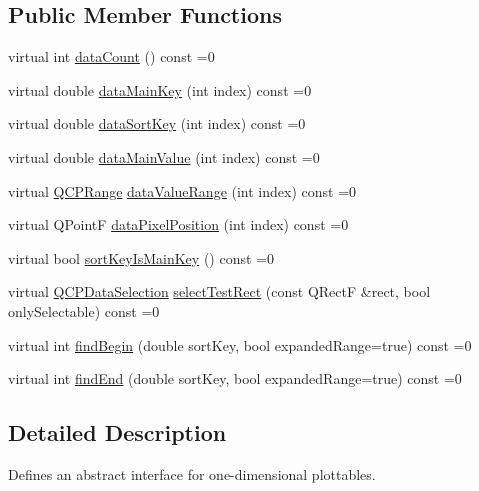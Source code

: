\subsection*{Public Member Functions}
\begin{DoxyCompactItemize}
\item 
virtual int \mbox{\hyperlink{class_q_c_p_plottable_interface1_d_a058a22c770ef4d5a0e878a7f02183da9}{data\+Count}} () const =0
\item 
virtual double \mbox{\hyperlink{class_q_c_p_plottable_interface1_d_a2bd60daaac046945fead558cbd83cf73}{data\+Main\+Key}} (int index) const =0
\item 
virtual double \mbox{\hyperlink{class_q_c_p_plottable_interface1_d_afdc92f9f01e7e35f2e96b2ea9dc14ae7}{data\+Sort\+Key}} (int index) const =0
\item 
virtual double \mbox{\hyperlink{class_q_c_p_plottable_interface1_d_af6330919e8023277d08c958a6074fc76}{data\+Main\+Value}} (int index) const =0
\item 
virtual \mbox{\hyperlink{class_q_c_p_range}{Q\+C\+P\+Range}} \mbox{\hyperlink{class_q_c_p_plottable_interface1_d_a9ca7fcf14d885a200879768679b19be9}{data\+Value\+Range}} (int index) const =0
\item 
virtual Q\+PointF \mbox{\hyperlink{class_q_c_p_plottable_interface1_d_a78911838cfbcfd2d8df9ad2fdbfb8e93}{data\+Pixel\+Position}} (int index) const =0
\item 
virtual bool \mbox{\hyperlink{class_q_c_p_plottable_interface1_d_a229e65e7ab968dd6cd0e259fa504b79d}{sort\+Key\+Is\+Main\+Key}} () const =0
\item 
virtual \mbox{\hyperlink{class_q_c_p_data_selection}{Q\+C\+P\+Data\+Selection}} \mbox{\hyperlink{class_q_c_p_plottable_interface1_d_a67093e4ccf490ff5f7750640941ff34c}{select\+Test\+Rect}} (const Q\+RectF \&rect, bool only\+Selectable) const =0
\item 
virtual int \mbox{\hyperlink{class_q_c_p_plottable_interface1_d_a5b95783271306a4de97be54eac1e7d13}{find\+Begin}} (double sort\+Key, bool expanded\+Range=true) const =0
\item 
virtual int \mbox{\hyperlink{class_q_c_p_plottable_interface1_d_a5deced1016bc55a41a2339619045b295}{find\+End}} (double sort\+Key, bool expanded\+Range=true) const =0
\end{DoxyCompactItemize}


\subsection{Detailed Description}
Defines an abstract interface for one-\/dimensional plottables. 

